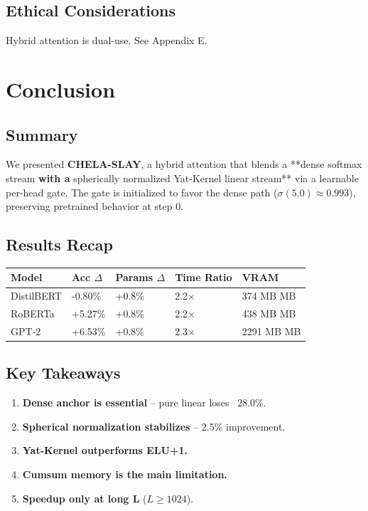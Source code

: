 \subsection{Ethical Considerations}

Hybrid attention is dual-use. See Appendix E.



\section{Conclusion}

\subsection{Summary}

We presented \textbf{CHELA-SLAY}, a hybrid attention that blends a **dense softmax 
stream\textbf{ with a }spherically normalized Yat-Kernel linear stream** via a 
learnable per-head gate. The gate is initialized to favor the dense path 
($\sigma(5.0) \approx 0.993$), preserving pretrained 
behavior at step 0.

\subsection{Results Recap}

\begin{table}[H]
\centering
\small
\begin{tabular}{lllll}
\toprule
\textbf{Model} & \textbf{Acc $\Delta$} & \textbf{Params $\Delta$} & \textbf{Time Ratio} & \textbf{VRAM} \\
\midrule
DistilBERT & -0.80\% & +0.8\% & 2.2$\times$ & 374 MB MB \\
RoBERTa & +5.27\% & +0.8\% & 2.2$\times$ & 438 MB MB \\
GPT-2 & +6.53\% & +0.8\% & 2.3$\times$ & 2291 MB MB \\
\bottomrule
\end{tabular}
\end{table}

\subsection{Key Takeaways}

\begin{enumerate}
\item \textbf{Dense anchor is essential} -- pure linear loses ~28.0\%.
\item \textbf{Spherical normalization stabilizes} -- 2.5\% improvement.
\item \textbf{Yat-Kernel outperforms ELU+1.}
\item \textbf{Cumsum memory is the main limitation.}
\item \textbf{Speedup only at long L} ($L \geq 1024$).

\end{enumerate}
